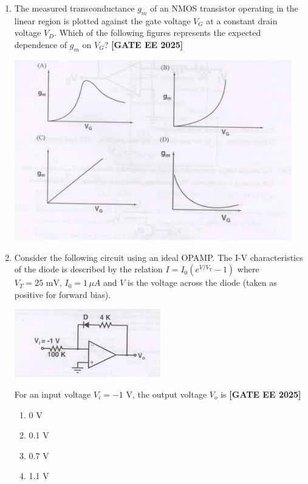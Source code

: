 \documentclass[12pt,a4paper]{article}
\begin{document}
\begin{enumerate}[leftmargin=*, label=\textbf{Q.\arabic*:}]
\item The measured transconductance $g_m$ of an NMOS transistor operating in the linear region is plotted against the gate voltage $V_G$ at a constant drain voltage $V_D$. Which of the following figures represents the expected dependence of $g_m$ on $V_G$?
\newline
\noindent \textbf{[GATE EE 2025]}
\begin{center}
\includegraphics[width=0.95\textwidth]{figs/q45.png}
\end{center}

\item Consider the following circuit using an ideal OPAMP. The I-V characteristics of the diode is described by the relation $I = I_0 \left( e^{V/V_T} - 1 \right)$ where $V_T = 25\text{ mV}$, $I_0 = 1\,\mu A$ and $V$ is the voltage across the diode (taken as positive for forward bias).

\begin{center}
\includegraphics[width=0.5\textwidth]{figs/q46.png}
\end{center}

For an input voltage $V_i = -1$ V, the output voltage $V_o$ is
\newline
\noindent \textbf{[GATE EE 2025]}
\begin{enumerate}[label=(\Alph*)]
  \item 0 V
  \item 0.1 V
  \item 0.7 V
  \item 1.1 V
\end{enumerate}


\end{enumerate}
\end{document}
